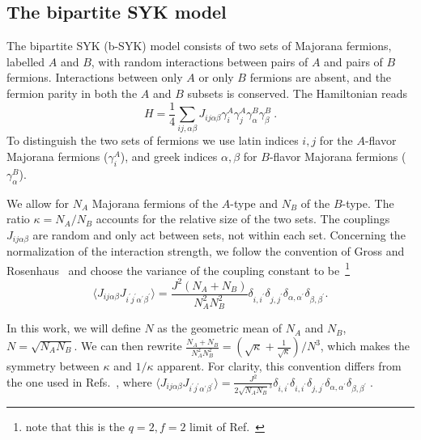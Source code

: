 \subsection{The bipartite SYK model}

The bipartite SYK (b-SYK) model consists of two sets of Majorana fermions, labelled $A$ and $B$,
with random interactions between pairs of $A$ and pairs of $B$ fermions.
Interactions between only $A$ or only $B$ fermions are absent,
and the fermion parity in both the $A$ and $B$ subsets is conserved.
The Hamiltonian reads
%
\begin{equation}
	H = \frac{1}{4}\sum_{ij,\alpha\beta}J_{ij\alpha\beta}\gamma^A_i\gamma^A_j \gamma^B_\alpha \gamma^B_\beta~.
\end{equation}
%
To distinguish the two sets of fermions we use latin indices $i,j$ for the $A$-flavor Majorana fermions ($\gamma_i^A$),
and greek indices $\alpha,\beta$ for $B$-flavor Majorana fermions ($\gamma_\alpha^B$).

We allow for $N_A$ Majorana fermions of the $A$-type and $N_B$ of the $B$-type.
The ratio $\kappa=N_A/N_B$ accounts for the relative size of the two sets.
The couplings $J_{ij\alpha\beta}$ are random and only act between sets, not within each set.
Concerning the normalization of the interaction strength, we follow the convention of Gross and Rosenhaus~\cite{gross_generalization_2017} and choose the variance of the coupling constant to be~\footnote {note that this is the $q=2, f=2$ limit of Ref.~\cite{gross_generalization_2017}}
%
\[
\langle J_{ij\alpha\beta} J_{i^{\prime}j^{\prime}\alpha^{\prime}\beta^{\prime}}\rangle=
\frac{J^2(N_A+N_B)}{N_A^2N_B^2}\delta_{i,i^{\prime}}\delta_{j,j^{\prime}}\delta_{\alpha,\alpha^{\prime}}\delta_{\beta,\beta^{\prime}}.
\] 

In this work, we will define $N$ as the geometric mean of $N_A$ and $N_B$, $N=\sqrt{N_{A}N_{B}}$.
We can then rewrite $\frac{N_A+N_B}{N_A^2N_B^2}=(\sqrt{\kappa} + \frac{1}{\sqrt{\kappa}})/N^3$,
which makes the symmetry between $\kappa$ and $1/\kappa$ apparent.
For clarity, this convention differs from the one used in Refs.~\cite{Fremling_2022,fremling_bipartite_2021}, where 
%
$
\langle J_{ij\alpha\beta} J_{i^{\prime}j^{\prime}\alpha^{\prime}\beta^{\prime}}\rangle=
\frac{J^2}{2\sqrt{N_A N_B}^3}\delta_{i,i^{\prime}}\delta_{i,i^{\prime}}\delta_{j,j^{\prime}}\delta_{\alpha,\alpha^{\prime}}\delta_{\beta,\beta^{\prime}}\;.$



